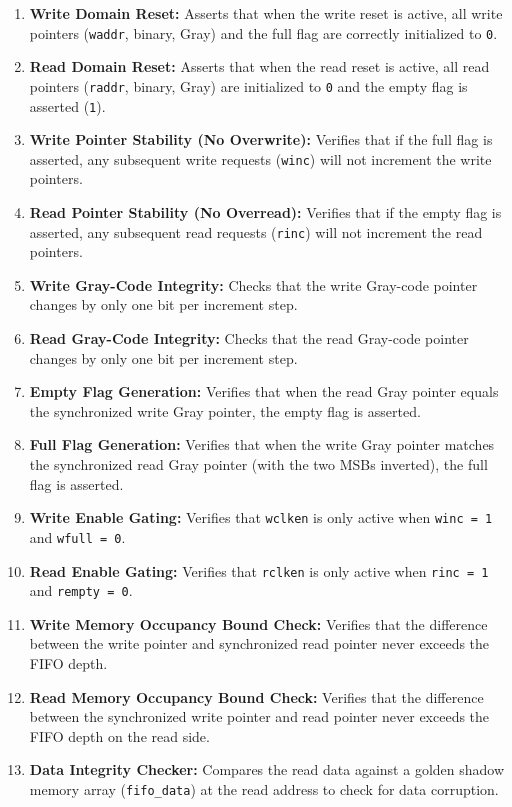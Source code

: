 \documentclass[
]{article}
\providecommand{\tightlist}{%
  \setlength{\itemsep}{0pt}\setlength{\parskip}{0pt}}
\begin{document}
\begin{enumerate}
\def\labelenumi{\arabic{enumi}.}
\tightlist
\item
  \textbf{Write Domain Reset:} Asserts that when the write reset is
  active, all write pointers (\texttt{waddr}, binary, Gray) and the full
  flag are correctly initialized to \texttt{0}.
\item
  \textbf{Read Domain Reset:} Asserts that when the read reset is
  active, all read pointers (\texttt{raddr}, binary, Gray) are
  initialized to \texttt{0} and the empty flag is asserted (\texttt{1}).
\item
  \textbf{Write Pointer Stability (No Overwrite):} Verifies that if the
  full flag is asserted, any subsequent write requests (\texttt{winc})
  will not increment the write pointers.
\item
  \textbf{Read Pointer Stability (No Overread):} Verifies that if the
  empty flag is asserted, any subsequent read requests (\texttt{rinc})
  will not increment the read pointers.
\item
  \textbf{Write Gray-Code Integrity:} Checks that the write Gray-code
  pointer changes by only one bit per increment step.
\item
  \textbf{Read Gray-Code Integrity:} Checks that the read Gray-code
  pointer changes by only one bit per increment step.
\item
  \textbf{Empty Flag Generation:} Verifies that when the read Gray
  pointer equals the synchronized write Gray pointer, the empty flag is
  asserted.
\item
  \textbf{Full Flag Generation:} Verifies that when the write Gray
  pointer matches the synchronized read Gray pointer (with the two MSBs
  inverted), the full flag is asserted.
\item
  \textbf{Write Enable Gating:} Verifies that \texttt{wclken} is only
  active when \texttt{winc\ =\ 1} and \texttt{wfull\ =\ 0}.
\item
  \textbf{Read Enable Gating:} Verifies that \texttt{rclken} is only
  active when \texttt{rinc\ =\ 1} and \texttt{rempty\ =\ 0}.
\item
  \textbf{Write Memory Occupancy Bound Check:} Verifies that the
  difference between the write pointer and synchronized read pointer
  never exceeds the FIFO depth.
\item
  \textbf{Read Memory Occupancy Bound Check:} Verifies that the
  difference between the synchronized write pointer and read pointer
  never exceeds the FIFO depth on the read side.
\item
  \textbf{Data Integrity Checker:} Compares the read data against a
  golden shadow memory array (\texttt{fifo\_data}) at the read address
  to check for data corruption.
\end{enumerate}
\end{document}
